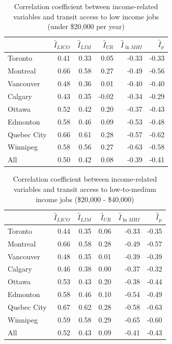 \documentclass[11 pt, letterpaper]{article}
\begin{document}
{\begin{table}[H]
	\vspace{2mm}
	\centering
	\renewcommand{\arraystretch}{0.75} %
	\caption{Correlation coefficient between income-related variables and transit access to low income jobs (under \$20,000 per year)}
	\label{AiT_income_u20}
	\begin{tabular}{l|rrrrr}
		& $\hat I_{LICO}$ & $\hat I_{LIM}$  & $\hat I_{UR}$ & $\hat I_{\ln MHI}$ & $\hat I_\mu$   \\
		\hline
		Toronto     & 0.41 & 0.33 & 0.05  & -0.33 & -0.33 \\
		Montreal    & 0.66 & 0.58 & 0.27  & -0.49 & -0.56 \\
		Vancouver   & 0.48 & 0.36 & 0.01  & -0.40 & -0.40 \\
		Calgary     & 0.43 & 0.35 & -0.02 & -0.34 & -0.29 \\
		Ottawa      & 0.52 & 0.42 & 0.20  & -0.37 & -0.43 \\
		Edmonton    & 0.58 & 0.46 & 0.09  & -0.53 & -0.48 \\
		Quebec City & 0.66 & 0.61 & 0.28  & -0.57 & -0.62 \\
		Winnipeg    & 0.58 & 0.56 & 0.27  & -0.63 & -0.58 \\
		\hline
		All         & 0.50 & 0.42 & 0.08  & -0.39 & -0.41
	\end{tabular}
\end{table}

\begin{table}[H]
	\vspace{2mm}
	\centering
	\renewcommand{\arraystretch}{0.75} %
	\caption{Correlation coefficient between income-related variables and transit access to low-to-medium income jobs (\$20,000 - \$40,000)}
	\label{AiT_income_2040}
	\begin{tabular}{l|rrrrr}
		& $\hat I_{LICO}$ & $\hat I_{LIM}$  & $\hat I_{UR}$ & $\hat I_{\ln MHI}$ & $\hat I_\mu$   \\
		\hline
		Toronto     & 0.44 & 0.35 & 0.06 & -0.33 & -0.35 \\
		Montreal    & 0.66 & 0.58 & 0.28 & -0.49 & -0.57 \\
		Vancouver   & 0.48 & 0.35 & 0.01 & -0.39 & -0.39 \\
		Calgary     & 0.46 & 0.38 & 0.00 & -0.37 & -0.32 \\
		Ottawa      & 0.53 & 0.43 & 0.20 & -0.38 & -0.44 \\
		Edmonton    & 0.58 & 0.46 & 0.10 & -0.54 & -0.49 \\
		Quebec City & 0.67 & 0.62 & 0.28 & -0.58 & -0.63 \\
		Winnipeg    & 0.59 & 0.58 & 0.29 & -0.65 & -0.60 \\
		\hline
		All         & 0.52 & 0.43 & 0.09 & -0.41 & -0.43
	\end{tabular}
\end{table}


}
\end{document}
